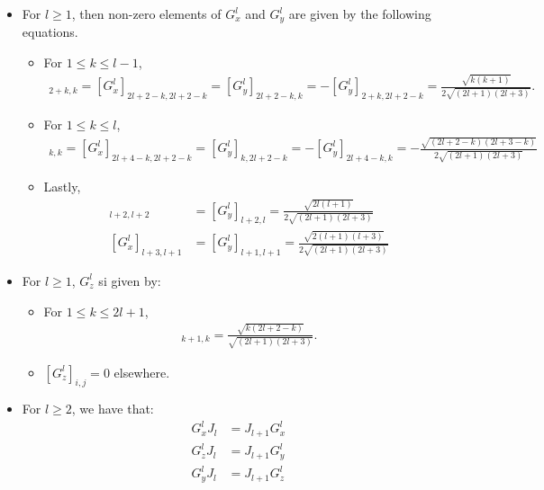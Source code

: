 \documentclass[10pt]{article}
\begin{document}
\begin{itemize}
        \item For $l \geq 1$, then non-zero elements of $G^l_x$ and $G^l_y$ are given by the following equations.
        \begin{itemize}
            \item For $1 \leq k \leq l-1$,
            \begin{align*}
                [G^l_x]_{2+k,k}
                = [G^l_x]_{2l+2-k,2l+2-k}
                = [G^l_y]_{2l+2-k,k}
                = -[G^l_y]_{2+k,2l+2-k}
                = \frac{\sqrt{k(k+1)}}{2\sqrt{(2l+1)(2l+3)}}.
            \end{align*}
            \item For $1 \leq k \leq l$,
            \begin{align*}
                [G^l_x]_{k,k}
                = [G^l_x]_{2l+4-k,2l+2-k}
                = [G^l_y]_{k,2l+2-k}
                = -[G^l_y]_{2l+4-k,k}
                = -\frac{\sqrt{(2l+2-k)(2l+3-k)}}{2\sqrt{(2l+1)(2l+3)}}
            \end{align*}
            \item Lastly,
            \begin{align*}
                [G^l_x]_{l+2,l+2} &= [G^l_y]_{l+2,l} = \frac{\sqrt{2l(l+1)}}{2\sqrt{(2l+1)(2l+3)}} \\
                [G^l_x]_{l+3,l+1} &= [G^l_y]_{l+1,l+1} = \frac{\sqrt{2(l+1)(l+3)}}{2\sqrt{(2l+1)(2l+3)}}
            \end{align*}
        \end{itemize}

        \item For $l \geq 1$, $G^l_z$ si given by:
        \begin{itemize}
            \item  For $1 \leq k \leq 2l+1$,
            \begin{align*}
                [G^l_z]_{k+1,k} = \frac{\sqrt{k(2l+2-k)}}{\sqrt{(2l+1)(2l+3)}}.
            \end{align*}
            \item $[G^l_z]_{i,j} = 0$ elsewhere.
        \end{itemize}
        
        \item For $l \geq 2$, we have that:
        \begin{align*}
            G^l_x J_l &= J_{l+1} G^l_x \\
            G^l_z J_l &= J_{l+1} G^l_y \\
            G^l_y J_l &= J_{l+1} G^l_z 
        \end{align*}


\end{itemize}
\end{document}
